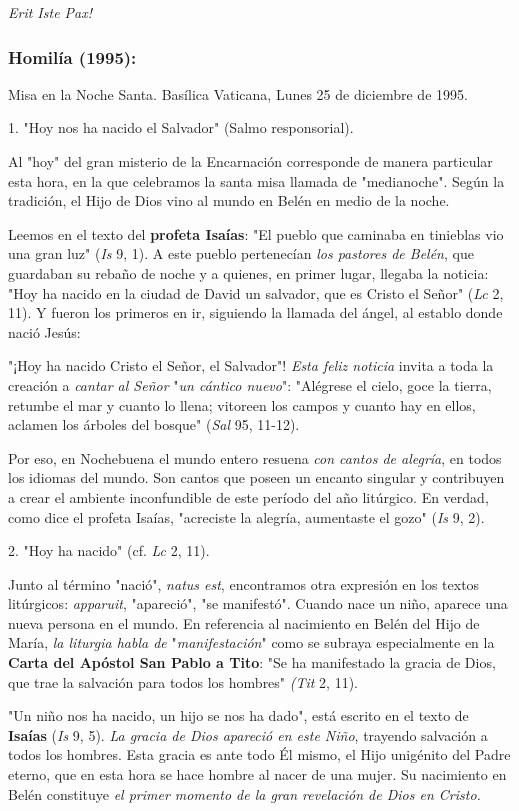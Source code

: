 \emph{Erit Iste Pax!}

\subsubsection{Homilía (1995): }
Misa en la Noche Santa. Basílica Vaticana, Lunes 25 de diciembre de
1995.

1. "Hoy nos ha nacido el Salvador" (Salmo responsorial).

Al "hoy" del gran misterio de la Encarnación corresponde de manera
particular esta hora, en la que celebramos la santa misa llamada de
"medianoche". Según la tradición, el Hijo de Dios vino al mundo en Belén
en medio de la noche.

Leemos en el texto del \textbf{profeta Isaías}: "El pueblo que caminaba
en tinieblas vio una gran luz" (\emph{Is} 9, 1). A este pueblo
pertenecían \emph{los pastores de Belén}, que guardaban su rebaño de
noche y a quienes, en primer lugar, llegaba la noticia: "Hoy ha nacido
en la ciudad de David un salvador, que es Cristo el Señor" (\emph{Lc} 2,
11). Y fueron los primeros en ir, siguiendo la llamada del ángel, al
establo donde nació Jesús:

"¡Hoy ha nacido Cristo el Señor, el Salvador"! \emph{Esta feliz noticia}
invita a toda la creación a \emph{cantar al Señor} "\emph{un cántico
	nuevo}": "Alégrese el cielo, goce la tierra, retumbe el mar y cuanto lo
llena; vitoreen los campos y cuanto hay en ellos, aclamen los árboles
del bosque" (\emph{Sal} 95, 11-12).

Por eso, en Nochebuena el mundo entero resuena \emph{con cantos de
	alegría}, en todos los idiomas del mundo. Son cantos que poseen un
encanto singular y contribuyen a crear el ambiente inconfundible de este
período del año litúrgico. En verdad, como dice el profeta Isaías,
"acreciste la alegría, aumentaste el gozo" (\emph{Is} 9, 2).

2. "Hoy ha nacido" (cf. \emph{Lc} 2, 11).

Junto al término "nació", \emph{natus est}, encontramos otra expresión
en los textos litúrgicos: \emph{apparuit}, "apareció", "se manifestó".
Cuando nace un niño, aparece una nueva persona en el mundo. En
referencia al nacimiento en Belén del Hijo de María, \emph{la liturgia
	habla de} "\emph{manifestación}" como se subraya especialmente en la
\textbf{Carta del Apóstol San Pablo a Tito}: "Se ha manifestado la
gracia de Dios, que trae la salvación para todos los hombres"
\emph{(Tit} 2, 11).

"Un niño nos ha nacido, un hijo se nos ha dado", está escrito en el
texto de \textbf{Isaías} (\emph{Is} 9, 5). \emph{La gracia de Dios
	apareció en este Niño}, trayendo salvación a todos los hombres. Esta
gracia es ante todo Él mismo, el Hijo unigénito del Padre eterno, que en
esta hora se hace hombre al nacer de una mujer. Su nacimiento en Belén
constituye \emph{el primer momento de la gran revelación de Dios en
	Cristo.}

